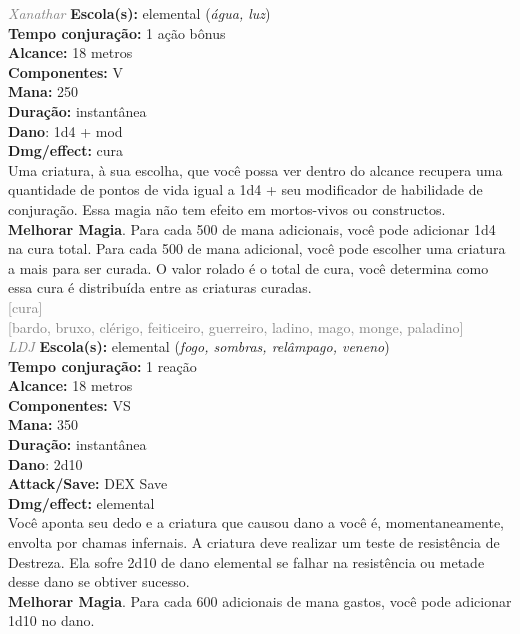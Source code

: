 \documentclass{RPG_Adventure}[2021/10/20]
\begin{document}
{\tiny \textcolor{gray}{\textit{Xanathar}}}
{\small \t \textbf{Escola(s):} elemental (\textit{água, luz})\\\t \textbf{Tempo conjuração:} 1 ação bônus\\\t \textbf{Alcance:} 18 metros\\\t \textbf{Componentes:} V\\\t \textbf{Mana:} 250\\\t \textbf{Duração:} instantânea\\\t \textbf{Dano}: 1d4 + mod\\\t \textbf{Dmg/effect:} cura\\}
{\normalsize Uma criatura, à sua escolha, que você possa ver dentro do alcance recupera uma quantidade de pontos de vida igual a 1d4 + seu modificador de habilidade de conjuração. Essa magia não tem efeito em mortos-vivos ou constructos.\\\t \textbf{Melhorar Magia}. Para cada 500 de mana adicionais, você pode adicionar 1d4 na cura total. Para cada 500 de mana adicional, você pode escolher uma criatura a mais para ser curada. O valor rolado é o total de cura, você determina como essa cura é distribuída entre as criaturas curadas.\\}
{\scriptsize \textcolor{gray}{[cura]\\}}
{\scriptsize \textcolor{gray}{[bardo, bruxo, clérigo, feiticeiro, guerreiro, ladino, mago, monge, paladino]\\}}
{\tiny \textcolor{gray}{\textit{LDJ}}}
{\small \t \textbf{Escola(s):} elemental (\textit{fogo, sombras, relâmpago, veneno})\\\t \textbf{Tempo conjuração:} 1 reação\\\t \textbf{Alcance:} 18 metros\\\t \textbf{Componentes:} VS\\\t \textbf{Mana:} 350\\\t \textbf{Duração:} instantânea\\\t \textbf{Dano}: 2d10\\\t \textbf{Attack/Save:} DEX Save\\\t \textbf{Dmg/effect:} elemental\\}
{\normalsize Você aponta seu dedo e a criatura que causou dano a você é, momentaneamente, envolta por chamas infernais. A criatura deve realizar um teste de resistência de Destreza. Ela sofre 2d10 de dano elemental se falhar na resistência ou metade desse dano se obtiver sucesso.\\\t \textbf{Melhorar Magia}. Para cada 600 adicionais de mana gastos, você pode adicionar 1d10 no dano.\\}
\end{document}
